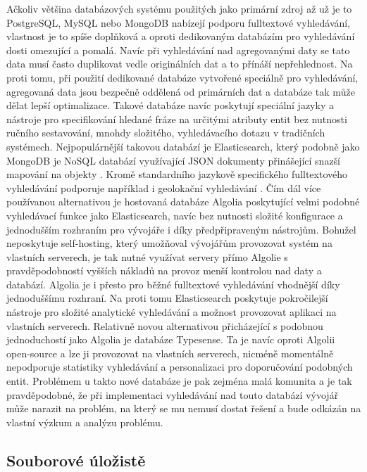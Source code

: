 		Ačkoliv většina databázových systému použitých jako primární zdroj až už je to PostgreSQL, MySQL nebo MongoDB
		nabízejí podporu fulltextové vyhledávání, vlastnost je to spíše doplňková a oproti dedikovaným databázím
		pro vyhledávání dosti omezující a pomalá.
		Navíc při vyhledávání nad agregovanými daty se tato data musí často duplikovat vedle originálních dat a to přínáší
		nepřehlednost.
		Na proti tomu, při použití dedikované databáze vytvořené speciálně pro vyhledávání, agregovaná data jsou bezpečně
		oddělená od primárních dat a databáze tak může dělat lepší optimalizace.
		Takové databáze navíc poskytují speciální jazyky a nástroje pro specifikování hledané fráze na určitými atributy
		entit bez nutnosti ručního sestavování, mnohdy složitého, vyhledávacího dotazu v tradičních systémech.
		Nejpopulárnější takovou databází je Elasticsearch, který podobně jako MongoDB je \Ac{NoSQL} databází
		využívající \Ac{JSON} dokumenty přinášející snazší mapování na objekty \cite{es_documents}.
		Kromě standardního jazykově specifického fulltextového vyhledávání podporuje například i geolokační vyhledávání
		\cite{es_documents}.
		Čím dál více používanou alternativou je hostovaná databáze Algolia poskytující velmi podobné vyhledávací
		funkce jako Elasticsearch, navíc bez nutnosti složité konfigurace a jednodušším rozhraním pro vývojáře i díky
		předpřipraveným nástrojům.
		Bohužel neposkytuje self-hosting, který umožňoval vývojářům provozovat systém na vlastních serverech, je tak
		nutné využívat servery přímo Algolie s pravděpodobností vyšších nákladů na provoz menší kontrolou nad daty a
		databází.
		Algolia je i přesto pro běžné fulltextové vyhledávání vhodnější díky jednoduššímu rozhraní.
		Na proti tomu Elasticsearch poskytuje pokročilejší nástroje pro složité analytické vyhledávání a možnost
		provozovat aplikaci na vlastních serverech.\cite{es_vs_algolia}
		Relativně novou alternativou přicházející s podobnou jednoduchostí jako Algolia je databáze Typesense.
		Ta je navíc oproti Algolii open-source a lze ji provozovat na vlastních serverech, nicméně momentálně nepodporuje
		statistiky vyhledávání a personalizaci pro doporučování podobných entit.\cite{typesence}
		Problémem u takto nové databáze je pak zejména malá komunita a je tak pravděpodobné, že při implementaci vyhledávání
		nad touto databází vývojář může narazit na problém, na který se mu nemusí dostat řešení a bude odkázán na vlastní
		výzkum a analýzu problému.

	\subsection{Souborové úložistě}

